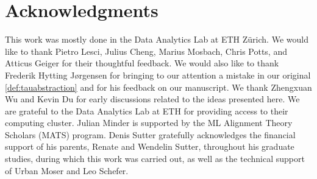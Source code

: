 \documentclass{article}
\begin{document}
\section*{Acknowledgments}

This work was mostly done in the Data Analytics Lab at ETH Z\"urich.
We would like to thank Pietro Lesci, Julius Cheng, Marius Mosbach, Chris Potts, and Atticus Geiger for their thoughtful feedback. 
We would also like to thank Frederik Hytting Jørgensen for bringing to our attention a mistake in our original \cref{def:tauabstraction} and for his feedback on our manuscript.
We thank Zhengxuan Wu and Kevin Du for early discussions related to the ideas presented here.
We are grateful to the Data Analytics Lab at ETH for providing access to their computing cluster. 
Julian Minder is supported by the ML Alignment Theory Scholars (MATS) program. 
Denis Sutter gratefully acknowledges the financial support of his parents, Renate and Wendelin Sutter, throughout his graduate studies, during which this work was carried out, as well as the technical support of Urban Moser and Leo Schefer.




\clearpage

\appendix


\end{document}
